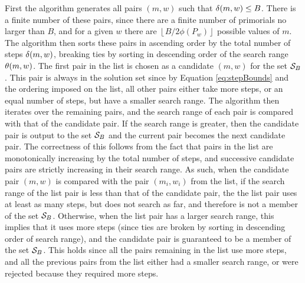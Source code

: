 \documentclass{ucalgthes1}
\theoremstyle{definition}
\newcommand{\floor}[1]{\left\lfloor #1 \right\rfloor}
\begin{document}
First the algorithm generates all pairs $(m, w)$ such that $\delta(m, w) \le B$.  There is a finite number of these pairs, since there are a finite number of primorials no larger than $B$, and for a given $w$ there are $\floor{B / 2\phi(P_w)}$ possible values of $m$.  The algorithm then sorts these pairs in ascending order by the total number of steps $\delta(m, w)$, breaking ties by sorting in descending order of the search range $\theta(m, w)$.  The first pair in the list is chosen as a candidate $(m, w)$ for the set $\mathcal S_B$.  This pair is always in the solution set since by Equation \ref{eq:stepBounds} and the ordering imposed on the list, all other pairs either take more steps, or an equal number of steps, but have a smaller search range.  The algorithm then iterates over the remaining pairs, and the search range of each pair is compared with that of the candidate pair.  If the search range is greater, then the candidate pair is output to the set $\mathcal S_B$ and the current pair becomes the next candidate pair.  The correctness of this follows from the fact that pairs in the list are monotonically increasing by the total number of steps, and successive candidate pairs are strictly increasing in their search range.  As such, when the candidate pair $(m, w)$ is compared with the pair $(m_i, w_i)$ from the list, if the search range of the list pair is less than that of the candidate pair, the the list pair uses at least as many steps, but does not search as far, and therefore is not a member of the set $\mathcal S_B$.  Otherwise, when the list pair has a larger search range, this implies that it uses more steps (since ties are broken by sorting in descending order of search range), and the candidate pair is guaranteed to be a member of the set $\mathcal S_B$.  This holds since all the pairs remaining in the list use more steps, and all the previous pairs from the list either had a smaller search range, or were rejected because they required more steps.
\end{document}
